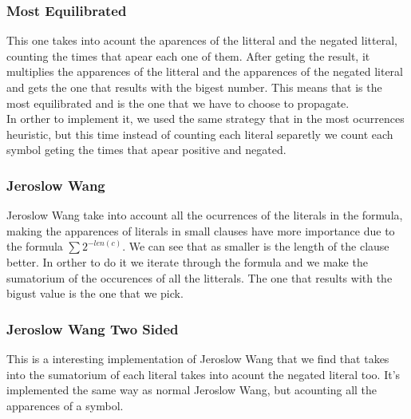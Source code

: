 \documentclass{article}
\begin{document}
\subsubsection{Most Equilibrated}
This one takes into acount the aparences of the litteral and the negated litteral, counting the times that apear each one of them. After geting the result, it multiplies the apparences of the litteral and the apparences of the negated literal and gets the one that results with the bigest number. This means that is the most equilibrated and is the one that we have to choose to propagate.\\
In orther to implement it, we used the same strategy that in the most ocurrences heuristic, but this time  instead of counting each literal separetly we count each symbol geting the times that apear positive and negated.
\subsubsection{Jeroslow Wang}
%
Jeroslow Wang take into account all the ocurrences of the literals in the formula, making the apparences of literals in small clauses have more importance due to the formula  $\sum 2^{-len(c)}$. We can see that as smaller is the length of the clause better.
In orther to do it we iterate through the formula and we make the sumatorium of the occurences of all the litterals. The one that results with the bigust value is the one that we pick. 
\subsubsection{Jeroslow Wang Two Sided}
%
This is a interesting implementation of Jeroslow Wang that we find that takes into the sumatorium of each literal takes into acount the negated literal too. It's implemented the same way as normal Jeroslow Wang, but acounting all the apparences of a symbol.
\end{document}
